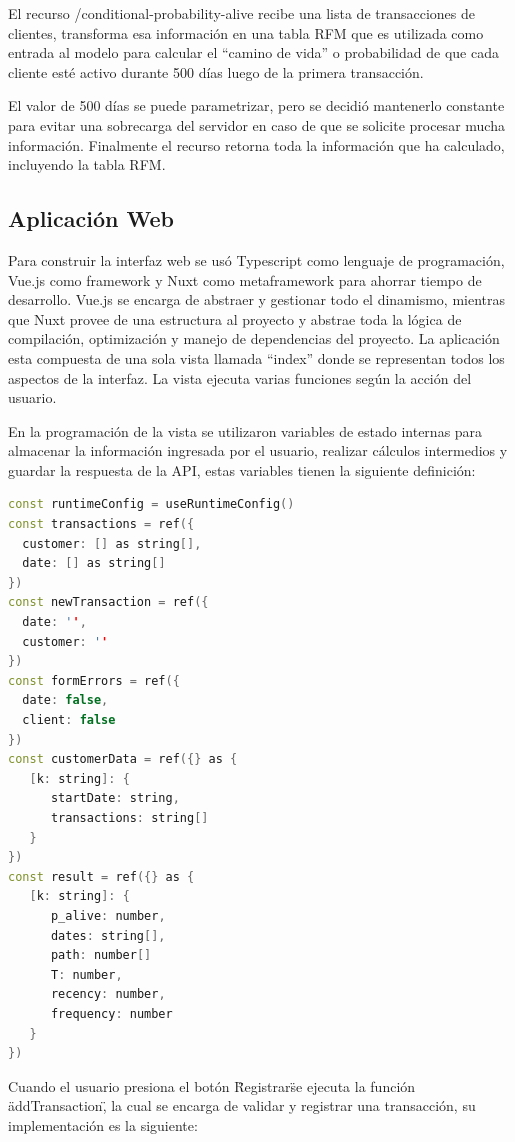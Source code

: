 	El recurso /conditional-probability-alive recibe una lista de transacciones de clientes, transforma esa información en una tabla RFM que es utilizada como entrada al modelo para calcular el “camino de vida” o probabilidad de que cada cliente esté activo durante 500 días luego de la primera transacción.

	El valor de 500 días se puede parametrizar, pero se decidió mantenerlo constante para evitar una sobrecarga del servidor en caso de que se solicite procesar mucha información. Finalmente el recurso retorna toda la información que ha calculado, incluyendo la tabla RFM.
	
\subsection{Aplicación Web}

Para construir la interfaz web se usó Typescript como lenguaje de programación, Vue.js como framework y Nuxt como metaframework para ahorrar tiempo de desarrollo. Vue.js se encarga de abstraer y gestionar todo el dinamismo, mientras que Nuxt provee de una estructura al proyecto y abstrae toda la lógica de compilación, optimización y manejo de dependencias del proyecto. La aplicación esta compuesta de una sola vista llamada “index” donde se representan todos los aspectos de la interfaz. La vista ejecuta varias funciones según la acción del usuario. 

En la programación de la vista se utilizaron variables de estado internas para almacenar la información ingresada por el usuario, realizar cálculos intermedios y guardar la respuesta de la API, estas variables tienen la siguiente definición:

\begin{lstlisting}[language=C++, caption=script en index.vue]
const runtimeConfig = useRuntimeConfig()
const transactions = ref({
  customer: [] as string[],
  date: [] as string[]
})
const newTransaction = ref({
  date: '',
  customer: ''
})
const formErrors = ref({
  date: false,
  client: false
})
const customerData = ref({} as {
   [k: string]: {
      startDate: string,
      transactions: string[]
   }
})
const result = ref({} as {
   [k: string]: {
      p_alive: number,
      dates: string[],
      path: number[]
      T: number,
      recency: number,
      frequency: number
   }
})
\end{lstlisting}	

Cuando el usuario presiona el botón \"Registrar\" se ejecuta la función \"addTransaction\", la cual se encarga de validar y registrar una transacción, su implementación es la siguiente:

